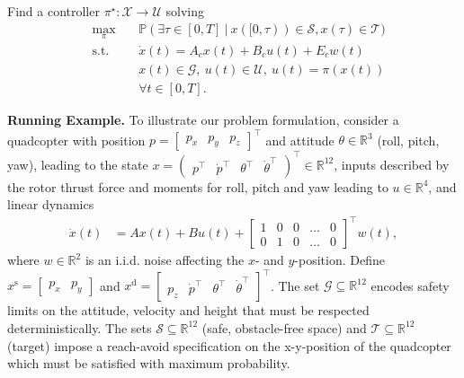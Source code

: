 \documentclass{IEEEtran}
\newcounter{problemcounter}
\begin{document}
\begin{mdframed}
Find a controller $\pi^{\star}:\mathcal{X}\rightarrow\mathcal{U}$ solving
    \begin{subequations}
        \label{prob_reach_avoid}
        \begin{align}
            &\!{\max}_{\pi} && \ \mathbb{P}(\exists \tau\!\in\![0,T] \ | \  x([0,\tau))\!\in\!\mathcal{S}, x(\tau)\!\in\!\mathcal{T}) 
             \\
            & \text{s.t.} && \ \dot x(t) = A_cx(t) + B_cu(t) + E_cw(t)
            \\
            &&& \ x(t)\!\in\!\mathcal{G}, \  u(t)\!\in\!\mathcal{U}, \ u(t)\!=\!\pi(x(t))  \\ &&& \ \forall t\!\in\![0,T].
        \end{align}
    \end{subequations}
\end{mdframed}
\textbf{Running Example.} To illustrate our problem formulation, consider a quadcopter with position $p=\begin{bmatrix}
    p_x & p_y & p_z
\end{bmatrix}^{\top}$ and attitude $\theta\in\mathbb{R}^3$ (roll, pitch, yaw), leading to the state $x = \begin{pmatrix} p^\top & \dot{p}^\top & \theta^\top & \dot{\theta}^\top \end{pmatrix}^\top\in\mathbb{R}^{12}$, inputs described by the rotor thrust force and moments for roll, pitch and yaw leading to $u\in\mathbb{R}^4$, and linear dynamics \cite{schmid2022real}
\begin{align}
    \dot{x}(t) &= Ax(t) + Bu(t) + \begin{bmatrix} 
    1 & 0 & 0 & \dots & 0\\
    0 & 1 & 0 & \dots & 0
    \end{bmatrix}^{\top}w(t),
    \label{eq_linear_model_quadcopter}
\end{align}
where $w\in\mathbb{R}^2$ is an i.i.d. noise affecting the $x$- and $y$-position. Define ${x}^{\text{s}}=\begin{bmatrix}
    p_x & p_y 
\end{bmatrix}$ and ${x}^{\text{d}}=\begin{bmatrix}
     p_z & \dot p^{\top} & \theta^{\top} & \dot \theta^{\top}
\end{bmatrix}^{\top}$. The set ${\mathcal{G}}\subseteq\mathbb{R}^{12}$ encodes safety limits on the attitude, velocity and height that must be respected deterministically. The sets ${\mathcal{S}}\subseteq\mathbb{R}^{12}$ (safe, obstacle-free space) and ${\mathcal{T}}\subseteq\mathbb{R}^{12}$ (target) impose a reach-avoid specification on the x-y-position of the quadcopter which must be satisfied with maximum probability. %
\end{document}
